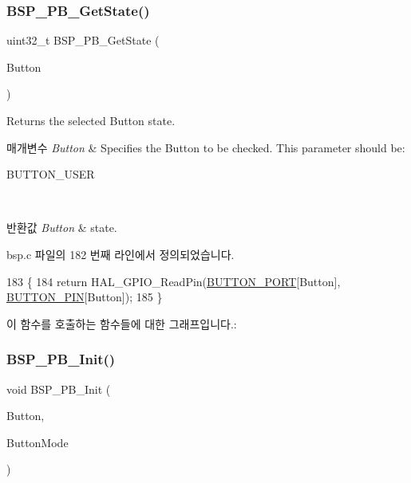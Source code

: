 \subsubsection{\texorpdfstring{B\+S\+P\+\_\+\+P\+B\+\_\+\+Get\+State()}{BSP\_PB\_GetState()}}
{\footnotesize\ttfamily uint32\+\_\+t B\+S\+P\+\_\+\+P\+B\+\_\+\+Get\+State (\begin{DoxyParamCaption}\item[{\mbox{\hyperlink{_lory_s_d_k__hw__conf_8h_a643816dfbad5c734fc25a29ce8d35bb1}{Button\+\_\+\+Type\+Def}}}]{Button }\end{DoxyParamCaption})}



Returns the selected Button state. 


\begin{DoxyParams}{매개변수}
{\em Button} & Specifies the Button to be checked. This parameter should be\+: \begin{DoxyItemize}
\item B\+U\+T\+T\+O\+N\+\_\+\+U\+S\+ER ~\newline
\end{DoxyItemize}
\\
\hline
\end{DoxyParams}

\begin{DoxyRetVals}{반환값}
{\em Button} & state. \\
\hline
\end{DoxyRetVals}


bsp.\+c 파일의 182 번째 라인에서 정의되었습니다.


\begin{DoxyCode}
183 \{
184   \textcolor{keywordflow}{return} HAL\_GPIO\_ReadPin(\mbox{\hyperlink{bsp_8c_ad63ed42b4071e78f80f7462227da4f35}{BUTTON\_PORT}}[Button], \mbox{\hyperlink{bsp_8c_adf78f2d71408a01f8d30929c2d2da82b}{BUTTON\_PIN}}[Button]);
185 \}
\end{DoxyCode}
이 함수를 호출하는 함수들에 대한 그래프입니다.\+:
\mbox{\label{group___b_u_t_t_o_n___functions_gad31c8db50a71c1f6dbfe132d72ba0bc6}} 
\subsubsection{\texorpdfstring{B\+S\+P\+\_\+\+P\+B\+\_\+\+Init()}{BSP\_PB\_Init()}}
{\footnotesize\ttfamily void B\+S\+P\+\_\+\+P\+B\+\_\+\+Init (\begin{DoxyParamCaption}\item[{\mbox{\hyperlink{_lory_s_d_k__hw__conf_8h_a643816dfbad5c734fc25a29ce8d35bb1}{Button\+\_\+\+Type\+Def}}}]{Button,  }\item[{\mbox{\hyperlink{_lory_s_d_k__hw__conf_8h_a48825b7c7d851c440ef8e808fd9d8f0a}{Button\+Mode\+\_\+\+Type\+Def}}}]{Button\+Mode }\end{DoxyParamCaption})}




